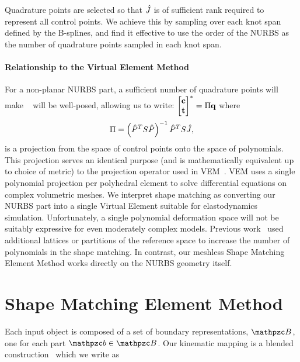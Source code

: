 Quadrature points are selected so that $\hat{J}$ is of sufficient rank required to represent all control points. We achieve this by sampling over each knot span defined by the  B-splines, and find it effective to use the order of the NURBS as the number of quadrature points sampled in each knot span.


\paragraph*{Relationship to the Virtual Element Method}
For a non-planar NURBS part, a sufficient number of quadrature points will make ~ will be well-posed, allowing us to write: $\begin{bmatrix} \mathbf{c}\\ \mathbf{t} \end{bmatrix}^* = \Pi\mathbf{q}$ where
\begin{equation*}
    \Pi = \left(\hat{P}^TS\hat{P}\right)^{-1}\hat{P}^TS\hat{J},
\end{equation*} is a projection from the space of control points onto the space of polynomials. 
This projection serves an identical purpose (and is mathematically equivalent up to choice of metric) to the projection operator used in VEM~\cite{10.1142/S021820251440003X}.
VEM uses a single polynomial projection per polyhedral element to solve differential equations on complex volumetric meshes.
We interpret shape matching as converting our NURBS part into a single Virtual Element suitable for elastodynamics simulation.
Unfortunately, a single polynomial deformation space will not be suitably expressive for even moderately complex models.
Previous work~\cite{10.1145/1073204.1073216,10.1145/1275808.1276480} used additional lattices or partitions of the reference space to 
increase the number of polynomials in the shape matching. In contrast, our meshless Shape Matching Element Method works directly on the NURBS
geometry itself.

\section{Shape Matching Element Method}
 Each input object is composed of a set of boundary representations, $\Prts$, one for each part $\prt\in\Prts$. 
 Our kinematic mapping is a blended construction~\cite{10.1145/2614028.2615427,blendedFORKS2016} which we write as

